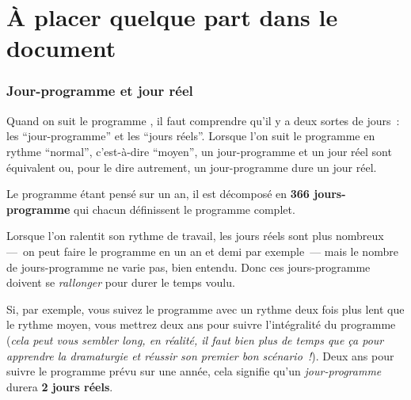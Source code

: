 %
% 

\chapter{À placer quelque part dans le document}
\label{a_placer_quelque_part_dans_le_document}


\subsection{Jour-programme et jour réel}\label{explicationjourprogrammejourreel}

Quand on suit le programme \unan{}, il faut comprendre qu'il y a deux sortes de jours~: les \enquote{jour-programme} et les \enquote{jours réels}. Lorsque l'on suit le programme en rythme \enquote{normal}, c'est-à-dire \enquote{moyen}, un jour-programme et un jour réel sont équivalent ou, pour le dire autrement, un jour-programme dure un jour réel.

Le programme \unan{} étant pensé sur un an, il est décomposé en \textbf{366 jours-programme} qui chacun définissent le programme complet.

Lorsque l'on ralentit son rythme de travail, les jours réels sont plus nombreux —~on peut faire le programme \unan{} en un an et demi par exemple~— mais le nombre de jours-programme ne varie pas, bien entendu. Donc ces jours-programme doivent se \emph{rallonger} pour durer le temps voulu.

Si, par exemple, vous suivez le programme \unan{} avec un rythme deux fois plus lent que le rythme moyen, vous mettrez deux ans pour suivre l'intégralité du programme (\emph{cela peut vous sembler long, en réalité, il faut bien plus de temps que ça pour apprendre la dramaturgie et réussir son premier bon scénario~!}). Deux ans pour suivre le programme prévu sur une année, cela signifie qu'un \emph{jour-programme} durera \textbf{2 jours réels}.
